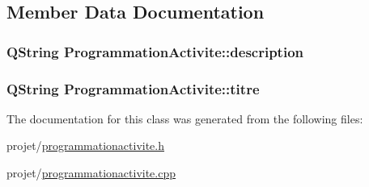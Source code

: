 \subsection{Member Data Documentation}
\hypertarget{class_programmation_activite_ae2a01c5cfffda9813ae77c1b98c7a52b}{}
\subsubsection[{description}]{\setlength{\rightskip}{0pt plus 5cm}Q\+String Programmation\+Activite\+::description\hspace{0.3cm}{\ttfamily [private]}}\label{class_programmation_activite_ae2a01c5cfffda9813ae77c1b98c7a52b}
\hypertarget{class_programmation_activite_aa6f6ff264184635b35615abb4e45ab62}{}
\subsubsection[{titre}]{\setlength{\rightskip}{0pt plus 5cm}Q\+String Programmation\+Activite\+::titre\hspace{0.3cm}{\ttfamily [private]}}\label{class_programmation_activite_aa6f6ff264184635b35615abb4e45ab62}


The documentation for this class was generated from the following files\+:\begin{DoxyCompactItemize}
\item 
projet/\hyperlink{programmationactivite_8h}{programmationactivite.\+h}\item 
projet/\hyperlink{programmationactivite_8cpp}{programmationactivite.\+cpp}\end{DoxyCompactItemize}
